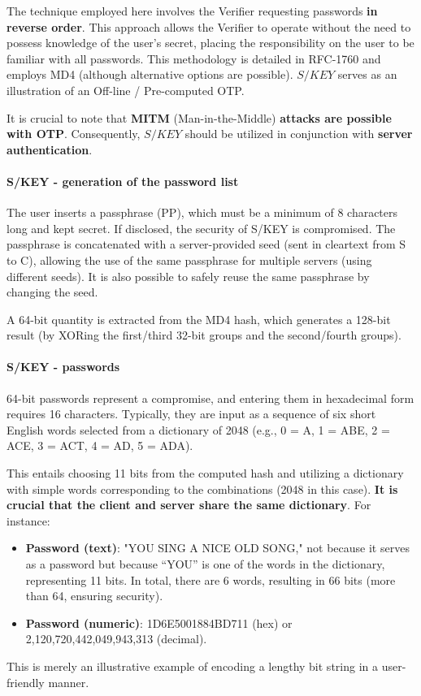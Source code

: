 The technique employed here involves the Verifier requesting passwords \textbf{in reverse order}. This approach allows the Verifier to operate without the need to possess knowledge of the user's secret, placing the responsibility on the user to be familiar with all passwords. This methodology is detailed in RFC-1760 and employs MD4 (although alternative options are possible). \(S/KEY\) serves as an illustration of an Off-line / Pre-computed OTP. 

It is crucial to note that \textbf{MITM} (Man-in-the-Middle) \textbf{attacks are possible with OTP}. Consequently, \(S/KEY\) should be utilized in conjunction with \textbf{server authentication}.


\paragraph{S/KEY - generation of the password list}
The user inserts a passphrase (PP), which must be a minimum of 8 characters long and kept secret. If disclosed, the security of S/KEY is compromised. The passphrase is concatenated with a server-provided seed (sent in cleartext from S to C), allowing the use of the same passphrase for multiple servers (using different seeds). It is also possible to safely reuse the same passphrase by changing the seed.

A 64-bit quantity is extracted from the MD4 hash, which generates a 128-bit result (by XORing the first/third 32-bit groups and the second/fourth groups).

\paragraph{S/KEY - passwords}
64-bit passwords represent a compromise, and entering them in hexadecimal form requires 16 characters. Typically, they are input as a sequence of six short English words selected from a dictionary of 2048 (e.g., 0 = A, 1 = ABE, 2 = ACE, 3 = ACT, 4 = AD, 5 = ADA).

This entails choosing 11 bits from the computed hash and utilizing a dictionary with simple words corresponding to the combinations (2048 in this case). \textbf{It is crucial that the client and server share the same dictionary}. For instance:
\begin{itemize}
\item \textbf{Password (text)}: "YOU SING A NICE OLD SONG," not because it serves as a password but because “YOU” is one of the words in the dictionary, representing 11 bits. In total, there are 6 words, resulting in 66 bits (more than 64, ensuring security).
\item \textbf{Password (numeric)}: 1D6E5001884BD711 (hex) or 2,120,720,442,049,943,313 (decimal).
\end{itemize}
This is merely an illustrative example of encoding a lengthy bit string in a user-friendly manner.


